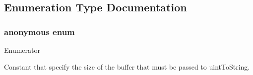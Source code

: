 \subsection{Enumeration Type Documentation}
\hypertarget{namespaceJson_a0c5f614b019f20b4598dcaec09d9e820}{\subsubsection[{anonymous enum}]{\setlength{\rightskip}{0pt plus 5cm}anonymous enum}}\label{namespaceJson_a0c5f614b019f20b4598dcaec09d9e820}
\begin{Desc}
\item[Enumerator]\par
\begin{description}
\item[{\em 
\hypertarget{namespaceJson_a0c5f614b019f20b4598dcaec09d9e820ae4f2008c7919f20d81286121d1374424}{uint\-To\-String\-Buffer\-Size}\label{namespaceJson_a0c5f614b019f20b4598dcaec09d9e820ae4f2008c7919f20d81286121d1374424}
}]Constant that specify the size of the buffer that must be passed to uint\-To\-String. \end{description}
\end{Desc}


